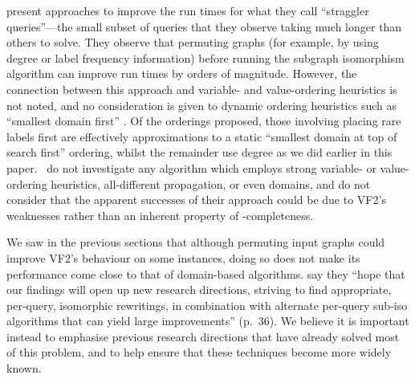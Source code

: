 \documentclass[twoside,11pt]{article}
\begin{document}
 present approaches to improve the run times for what they call
``straggler queries''---the small subset of queries that they observe taking much longer than others
to solve.  They observe that permuting graphs (for example, by using degree or label frequency
information) before running the subgraph isomorphism algorithm can improve run times by orders of
magnitude. However, the connection between this approach and variable- and value-ordering heuristics
is not noted, and no consideration is given to dynamic ordering heuristics such as ``smallest domain
first'' \cite{DBLP:journals/ai/HaralickE80}.  Of the orderings proposed, those involving placing
rare labels first are effectively approximations to a static ``smallest domain at top of search
first'' ordering, whilst the remainder use degree as we did earlier in this paper.
\citeauthor{DBLP:conf/edbt/KatsarouNT17}\ do not investigate any algorithm which employs strong
variable- or value-ordering heuristics, all-different propagation, or even domains, and do not
consider that the apparent successes of their approach could be due to VF2's weaknesses rather than
an inherent property of \NP-completeness.

We saw in the previous sections that although permuting input graphs could improve VF2's behaviour
on some instances, doing so does not make its performance come close to that of domain-based
algorithms.   say they ``hope that our findings will open up
new research directions, striving to find appropriate, per-query, isomorphic rewritings, in
combination with alternate per-query sub-iso algorithms that can yield large improvements''
(p.\ 36). We believe it is important instead to emphasise previous research directions that have already
solved most of this problem, and to help ensure that these techniques become more widely known.
\end{document}
